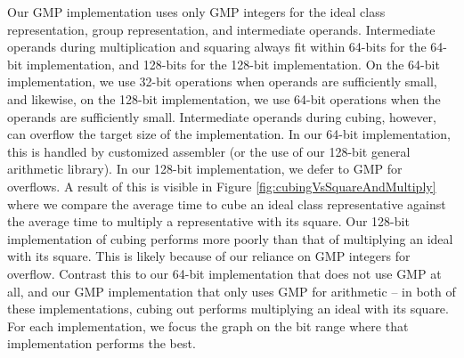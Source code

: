 \documentclass{ucalgthes1}
\theoremstyle{definition}
\begin{document}
Our GMP implementation uses only GMP integers for the ideal class representation, group representation, and intermediate operands.  Intermediate operands during multiplication and squaring always fit within 64-bits for the 64-bit implementation, and 128-bits for the 128-bit implementation.  On the 64-bit implementation, we use 32-bit operations when operands are sufficiently small, and likewise, on the 128-bit implementation, we use 64-bit operations when the operands are sufficiently small.  Intermediate operands during cubing, however, can overflow the target size of the implementation.  In our 64-bit implementation, this is handled by customized assembler (or the use of our 128-bit general arithmetic library).  In our 128-bit implementation, we defer to GMP for overflows.  A result of this is visible in Figure \ref{fig:cubingVsSquareAndMultiply} where we compare the average time to cube an ideal class representative against the average time to multiply a representative with its square.  Our 128-bit implementation of cubing performs more poorly than that of multiplying an ideal with its square.  This is likely because of our reliance on GMP integers for overflow.  Contrast this to our 64-bit implementation that does not use GMP at all, and our GMP implementation that only uses GMP for arithmetic -- in both of these implementations, cubing out performs multiplying an ideal with its square.  For each implementation, we focus the graph on the bit range where that implementation performs the best.
\end{document}
